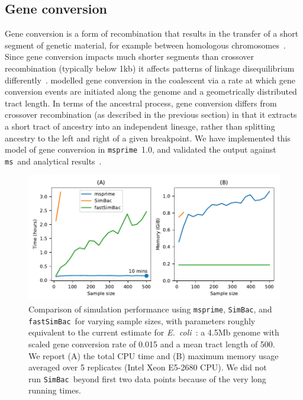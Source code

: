 \documentclass{article}
\newcommand{\msprime}[0]{\texttt{msprime}}
\newcommand{\ms}[0]{\texttt{ms}}
\newcommand{\SimBac}[0]{\texttt{SimBac}}
\newcommand{\FastSimBac}[0]{\texttt{fastSimBac}}
\begin{document}
\subsection*{Gene conversion}
Gene conversion is a form of recombination that results in the transfer
of a short segment of genetic material,
for example between homologous chromosomes~\citep{chen2007gene}.
Since gene conversion impacts much shorter segments than
crossover recombination (typically below 1kb) it
affects patterns of linkage disequilibrium differently~\citep{korunes2017gene}.
\cite{wiuf2000coalescent} modelled gene conversion in the coalescent
via a rate at which gene conversion events are initiated
along the genome and a geometrically distributed tract length.
In terms of the ancestral process, gene conversion differs from
crossover recombination (as described in the previous section)
in that it extracts a short tract of ancestry into
an independent lineage, rather than splitting ancestry
to the left and right of a given breakpoint.
We have implemented this model of gene
conversion in \msprime\ 1.0, and validated the output against
\ms\ and analytical results~\citep{wiuf2000coalescent}.

\begin{figure}
\begin{center}
\includegraphics{figures/gc-perf}
\end{center}
\caption{\label{fig-gc-perf}Comparison of simulation performance
using \msprime, \SimBac, and \FastSimBac\ for varying sample sizes,
with parameters roughly equivalent to the current estimate
for \textit{E.~coli}~\citep{lapierre2016the}:
a 4.5Mb genome with scaled gene conversion rate of 0.015 and
a mean tract length of 500.
We report (A) the total CPU time and (B) maximum memory usage
averaged over 5 replicates (Intel Xeon E5-2680 CPU).
We did not run \SimBac\ beyond first two data points because
of the very long running times.}
\end{figure}
\end{document}
